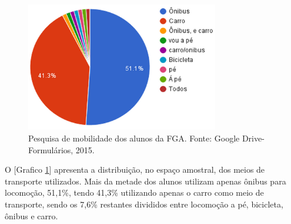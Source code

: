 \begin{figure}[H]
  \centering
  \includegraphics[width=0.75\textwidth]{figuras/pesquisa}
  \caption{Pesquisa de mobilidade dos alunos da FGA. Fonte: Google Drive-Formulários, 2015.}
  \label{img:pesquisa}
\end{figure}
 
O [Grafico \ref{img:pesquisa}] apresenta a distribuição, no espaço amostral, dos meios  de transporte utilizados. Mais da metade dos alunos utilizam apenas ônibus para locomoção, 51,1\%, tendo 41,3\% utilizando apenas o carro como meio de transporte, sendo os 7,6\% restantes divididos entre locomoção a pé, bicicleta, ônibus e carro.
